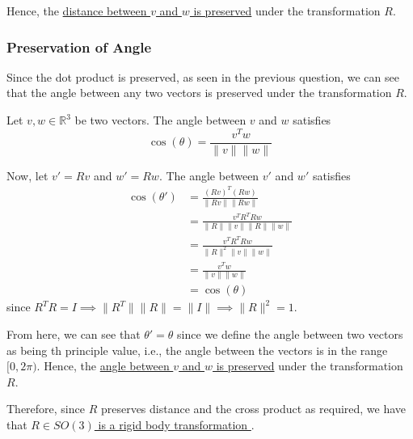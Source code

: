 Hence, the \underline{distance between \(v\) and \(w\) is preserved} under the transformation \(R\).

\subsubsection*{Preservation of Angle}

Since the dot product is preserved, as seen in the previous question, we can see that the angle between any two vectors is preserved under the transformation \( R \).

Let \(v, w \in \mathbb{R}^{3}\) be two vectors. The angle between \(v\) and \(w\) satisfies
\[
    \cos(\theta) = \frac{v^{T} w}{\lVert v \rVert \lVert w \rVert}
\]

Now, let \(v' = R v\) and \(w' = R w\). The angle between \(v'\) and \(w'\) satisfies
\begin{align*}
    \cos(\theta')
     & = \frac{{(R v)}^{T} (R w)}{\lVert R v \rVert \lVert R w \rVert}
    \\ & = \frac{v^{T} R^{T} R w}{\lVert R \rVert \lVert v \rVert \lVert R \rVert \lVert w \rVert}
    \\ & = \frac{v^{T} R^{T} R w}{\lVert R \rVert ^ 2 \lVert v \rVert \lVert w \rVert}
    \\ & = \frac{v^{T} w}{\lVert v \rVert \lVert w \rVert}
    \\ & = \cos(\theta)
\end{align*}
since \(R^{T} R = I \implies \lVert R^T \rVert \lVert R \rVert = \lVert I \rVert \implies \lVert R \rVert ^2 = 1\).

From here, we can see that \( \theta' = \theta \) since we define the angle between two vectors as being th principle value, i.e., the angle between the vectors is in the range \([0, 2\pi)\).
Hence, the \underline{angle between \(v\) and \(w\) is preserved} under the transformation \(R\).

Therefore, since \( R \) preserves distance and the cross product as required, we have that \underline{ \(R \in S O(3)\) is a rigid body transformation }.

